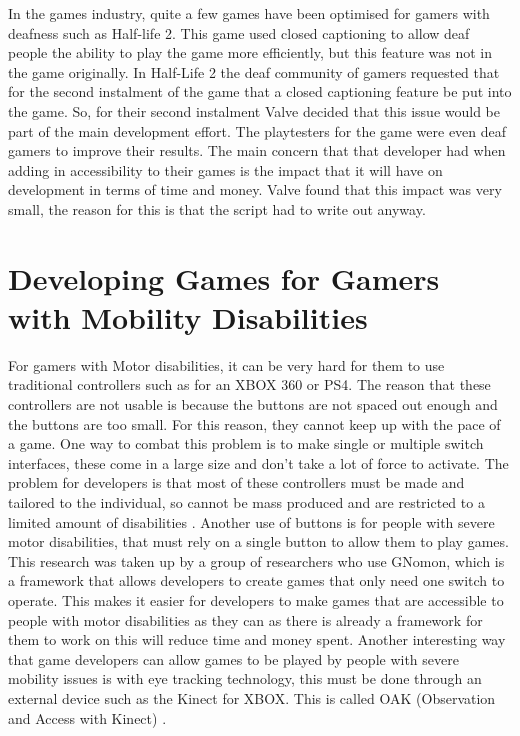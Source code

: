 \documentclass[11pt]{scrartcl}
\begin{document}
In the games industry, quite a few games have been optimised for gamers with deafness such as Half-life 2. This game used closed captioning to allow deaf people the ability to play the game more efficiently, but this feature was not in the game originally. In Half-Life 2 the deaf community of gamers requested that for the second instalment of the game that a closed captioning feature be put into the game. So, for their second instalment Valve decided that this issue would be part of the main development effort. The playtesters for the game were even deaf gamers to improve their results. The main concern that that developer had when adding in accessibility to their games is the impact that it will have on development in terms of time and money. Valve found that this impact was very small, the reason for this is that the script had to write out anyway\cite{bierre2005game}.


\section{Developing Games for Gamers with Mobility Disabilities}

For gamers with Motor disabilities, it can be very hard for them to use traditional controllers such as for an XBOX 360 or PS4. The reason that these controllers are not usable is because the buttons are not spaced out enough and the buttons are too small. For this reason, they cannot keep up with the pace of a game. One way to combat this problem is to make single or multiple switch interfaces, these come in a large size and don’t take a lot of force to activate. The problem for developers is that most of these controllers must be made and tailored to the individual, so cannot be mass produced and are restricted to a limited amount of disabilities \cite{6031883}. Another use of buttons is for people with severe motor disabilities, that must rely on a single button to allow them to play games. This research was taken up by a group of researchers who use GNomon, which is a framework that allows developers to create games that only need one switch to operate. This makes it easier for developers to make games that are accessible to people with motor disabilities as they can as there is already a framework for them to work on this will reduce time and money spent.\cite{7325502}
Another interesting way that game developers can allow games to be played by people with severe mobility issues is with eye tracking technology, this must be done through an external device such as the Kinect for XBOX. This is called OAK (Observation and Access with Kinect) \cite{7803137}.
\end{document}
